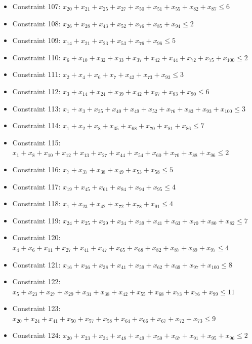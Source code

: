 \documentclass[11pt]{article}
\begin{document}
\begin{itemize}
\item Constraint 107: $x_{20} + x_{21} + x_{25} + x_{27} + x_{50} + x_{51} + x_{55} + x_{82} + x_{87} \le 6$
\item Constraint 108: $x_{26} + x_{28} + x_{43} + x_{52} + x_{76} + x_{85} + x_{94} \le 2$
\item Constraint 109: $x_{14} + x_{21} + x_{23} + x_{53} + x_{76} + x_{96} \le 5$
\item Constraint 110: $x_{6} + x_{10} + x_{32} + x_{33} + x_{37} + x_{42} + x_{44} + x_{72} + x_{75} + x_{100} \le 2$
\item Constraint 111: $x_{2} + x_{4} + x_{6} + x_{7} + x_{42} + x_{73} + x_{93} \le 3$
\item Constraint 112: $x_{3} + x_{14} + x_{24} + x_{39} + x_{42} + x_{67} + x_{83} + x_{90} \le 6$
\item Constraint 113: $x_{1} + x_{3} + x_{35} + x_{40} + x_{49} + x_{52} + x_{76} + x_{83} + x_{93} + x_{100} \le 3$
\item Constraint 114: $x_{1} + x_{2} + x_{8} + x_{35} + x_{68} + x_{70} + x_{81} + x_{86} \le 7$
\item Constraint 115: $x_{1} + x_{8} + x_{10} + x_{12} + x_{13} + x_{27} + x_{44} + x_{54} + x_{60} + x_{70} + x_{88} + x_{96} \le 2$
\item Constraint 116: $x_{7} + x_{37} + x_{38} + x_{49} + x_{53} + x_{58} \le 5$
\item Constraint 117: $x_{19} + x_{45} + x_{61} + x_{84} + x_{94} + x_{95} \le 4$
\item Constraint 118: $x_{1} + x_{23} + x_{42} + x_{72} + x_{78} + x_{91} \le 4$
\item Constraint 119: $x_{24} + x_{25} + x_{29} + x_{34} + x_{39} + x_{41} + x_{63} + x_{70} + x_{80} + x_{82} \le 7$
\item Constraint 120: $x_{4} + x_{6} + x_{11} + x_{27} + x_{41} + x_{47} + x_{65} + x_{68} + x_{82} + x_{87} + x_{89} + x_{97} \le 4$
\item Constraint 121: $x_{16} + x_{36} + x_{38} + x_{41} + x_{59} + x_{62} + x_{69} + x_{97} + x_{100} \le 8$
\item Constraint 122: $x_{5} + x_{23} + x_{27} + x_{29} + x_{31} + x_{38} + x_{42} + x_{55} + x_{68} + x_{73} + x_{76} + x_{99} \le 11$
\item Constraint 123: $x_{20} + x_{24} + x_{41} + x_{50} + x_{57} + x_{58} + x_{64} + x_{66} + x_{67} + x_{72} + x_{73} \le 9$
\item Constraint 124: $x_{20} + x_{23} + x_{34} + x_{48} + x_{49} + x_{50} + x_{67} + x_{91} + x_{95} + x_{96} \le 2$

\end{itemize}
\end{document}
